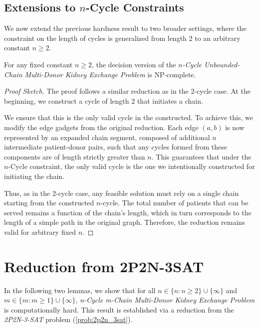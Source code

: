 \subsection{Extensions to $n$-Cycle Constraints}

We now extend the previous hardness result to two broader settings, where the constraint on the length of cycles is generalized from length 2 to an arbitrary constant $n \ge 2$.

\begin{lemma}
For any fixed constant $n \ge 2$, the decision version of the \textit{$n$-Cycle Unbounded-Chain Multi-Donor Kidney Exchange Problem} is NP-complete.
\end{lemma}

\begin{proof}[Proof Sketch]
The proof follows a similar reduction as in the 2-cycle case. At the beginning, we construct a cycle of length $2$ that initiates a chain. 

We ensure that this is the only valid cycle in the constructed. To achieve this, we modify the edge gadgets from the original reduction. Each edge $(a, b)$ is now represented by an expanded chain segment, composed of additional $n$ intermediate patient-donor pairs, such that any cycles formed from these components are of length strictly greater than $n$. This guarantees that under the $n$-Cycle constraint, the only valid cycle is the one we intentionally constructed for initiating the chain.

Thus, as in the 2-cycle case, any feasible solution must rely on a single chain starting from the constructed $n$-cycle. The total number of patients that can be served remains a function of the chain's length, which in turn corresponds to the length of a simple path in the original graph. Therefore, the reduction remains valid for arbitrary fixed $n$.
\end{proof}



\section{Reduction from 2P2N-3SAT}

In the following two lemmas, we show that for all $n \in \{n : n \ge 2\} \cup \{\infty\}$ and $m \in \{m:m \ge 1\} \cup \{\infty\}$, \textit{n-Cycle m-Chain Multi-Donor Kidney Exchange Problem} is computationally hard. This result is established via a reduction from the \textit{2P2N-3-SAT} problem (\autoref{prob:2p2n_3sat}). 

